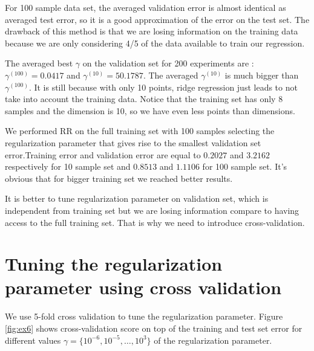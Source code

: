 \documentclass{article} %
\begin{document}
For 100 sample data set, the averaged validation error is almost identical as averaged test error, so it is a good approximation of the error on the test set. The drawback of this method is that we are losing information on the training data because we are only considering 4/5 of the data available to train our regression. 

The averaged best $\gamma$ on the validation set for 200 experiments are : $\gamma^{(100)} = 0.0417 $ and  $\gamma^{(10)} = 50.1787$. The averaged  $\gamma^{(10)}$ is much bigger than  $\gamma^{(100)}$. It is still because with only 10 points, ridge regression just leads to not take into account the training data. Notice that the training set has only 8 samples and the dimension is 10, so we have even less points than dimensions.

We performed RR on the full training set with 100 samples selecting the regularization parameter that gives rise to the smallest validation set error.Training error and validation error are equal to $0.2027$ and $3.2162$ respectively for 10 sample set and   $0.8513$ and $1.1106$  for 100 sample set. It's obvious that for bigger training set we reached better results.

It is better to tune regularization parameter on validation set, which is independent from training set but we are losing information compare to having access to the full training set. That is why we need to introduce cross-validation. 

\section{Tuning the regularization parameter using cross validation}
We use 5-fold cross validation to tune the regularization parameter. Figure \ref{fig:ex6} shows cross-validation score on top of the training and test set error for different values $\gamma = \{10^{-6}, 10^{-5}, \dots, 10^3 \}$ of the regularization parameter.
\end{document}
